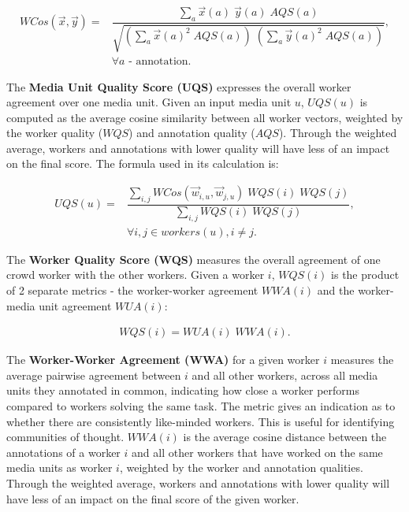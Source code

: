\begin{align}
WCos(\vec{x}, \vec{y}) = & \dfrac{\sum\limits_{a} \vec{x} (a) \; \vec{y} (a) \;  AQS(a)}{\sqrt{(\sum\limits_{a} \vec{x}(a)^2 \; AQS(a)) \; (\sum\limits_{a} \vec{y}(a)^2 \; AQS(a))}}, \\
& \forall a \text{ - annotation}. \nonumber
\end{align}

The \textbf{Media Unit Quality Score (UQS)} expresses the overall worker agreement over one media unit. Given an input media unit $u$, $UQS(u)$ is computed as the average cosine similarity between all worker vectors, weighted by the worker quality ($WQS$) and annotation quality ($AQS$). Through the weighted average, workers and annotations with lower quality will have less of an impact on the final score. The formula used in its calculation is:

\begin{align}
UQS(u) = & \dfrac{\sum\limits_{i, j} WCos(\vec{w}_{i,u} , \vec{w}_{j,u}) \; WQS(i) \; WQS(j)}{\sum\limits_{i,j} WQS(i) \; WQS(j)}, \\
& \forall i, j \in workers(u), i \neq j. \nonumber
\end{align}


The \textbf{Worker Quality Score (WQS)} measures the overall agreement of one crowd worker with the other workers. Given a worker $i$, $WQS(i)$ is the product of 2 separate metrics - the worker-worker agreement $WWA(i)$ and the worker-media unit agreement $WUA(i)$:

\begin{align}
WQS(i) = WUA(i) \; WWA(i) .
\end{align}

The \textbf{Worker-Worker Agreement (WWA)} for a given worker $i$ measures the average pairwise agreement between $i$ and all other workers, across all media units they annotated in common, indicating how close a worker performs compared to workers solving the same task.  The metric gives an indication as to whether there are consistently like-minded workers. This is useful for identifying communities of thought. $WWA(i)$ is the average cosine distance between the annotations of a worker $i$ and all other workers that have worked on the same media units as worker $i$, weighted by the worker and annotation qualities. Through the weighted average, workers and annotations with lower quality will have less of an impact on the final score of the given worker.

